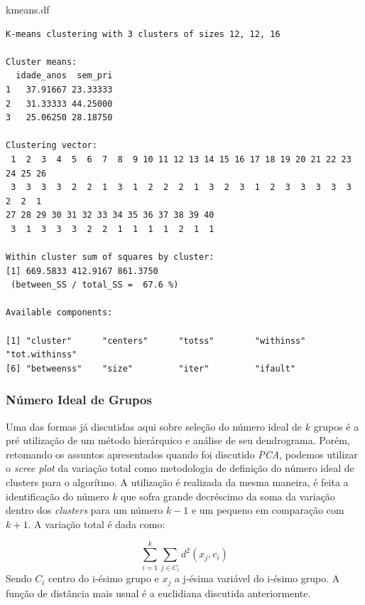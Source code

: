 \documentclass[
  letterpaper,
  DIV=11,
  numbers=noendperiod]{scrreprt}
\newenvironment{Shaded}{\begin{snugshade}}{\end{snugshade}}
\newcommand{\NormalTok}[1]{\textcolor[rgb]{0.00,0.23,0.31}{#1}}
\begin{document}
\begin{Shaded}
\begin{Highlighting}[]
\NormalTok{kmeans.df}
\end{Highlighting}
\end{Shaded}

\begin{verbatim}
K-means clustering with 3 clusters of sizes 12, 12, 16

Cluster means:
  idade_anos  sem_pri
1   37.91667 23.33333
2   31.33333 44.25000
3   25.06250 28.18750

Clustering vector:
 1  2  3  4  5  6  7  8  9 10 11 12 13 14 15 16 17 18 19 20 21 22 23 24 25 26 
 3  3  3  3  2  2  1  3  1  2  2  2  1  3  2  3  1  2  3  3  3  3  3  2  2  1 
27 28 29 30 31 32 33 34 35 36 37 38 39 40 
 3  1  3  3  3  2  2  1  1  1  1  2  1  1 

Within cluster sum of squares by cluster:
[1] 669.5833 412.9167 861.3750
 (between_SS / total_SS =  67.6 %)

Available components:

[1] "cluster"      "centers"      "totss"        "withinss"     "tot.withinss"
[6] "betweenss"    "size"         "iter"         "ifault"      
\end{verbatim}

\hypertarget{nuxfamero-ideal-de-grupos}{%
\subsubsection{Número Ideal de Grupos}\label{nuxfamero-ideal-de-grupos}}

Uma das formas já discutidas aqui sobre seleção do número ideal de \(k\)
grupos é a pré utilização de um método hierárquico e análise de seu
dendrograma. Porém, retomando os assuntos apresentados quando foi
discutido \emph{PCA}, podemos utilizar o \emph{scree plot} da variação
total como metodologia de definição do número ideal de clusters para o
algorítmo. A utilização é realizada da mesma maneira, é feita a
identificação do número \(k\) que sofra grande decréscimo da soma da
variação dentro dos \emph{clusters} para um número \(k-1\) e um pequeno
em comparação com \(k+1\). A variação total é dada como:

\[
\sum^k_{i=1}\sum_{j\in C_i}d^2(x_j,c_i)
\] Sendo \(C_i\) centro do i-ésimo grupo e \(x_j\) a j-ésima variável do
i-ésimo grupo. A função de distância mais usual é a euclidiana discutida
anteriormente.
\end{document}
